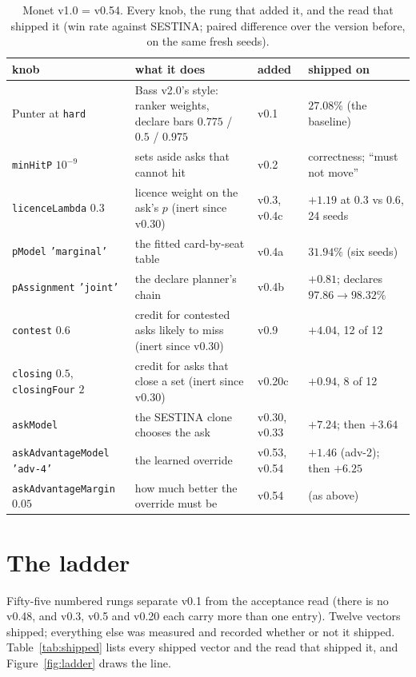 \documentclass[11pt]{article}
\newcommand{\code}[1]{\texttt{#1}}
\begin{document}
\begin{table}[t]
\centering
\small
\caption{Monet v1.0 = v0.54. Every knob, the rung that added it, and the read that shipped it (win rate
against SESTINA; paired difference over the version before, on the same fresh seeds).}
\label{tab:vector}
\begin{tabularx}{\linewidth}{@{}l>{\raggedright\arraybackslash}Xll@{}}
\toprule
knob & what it does & added & shipped on \\
\midrule
Punter at \code{hard} & Bass v2.0's style: ranker weights, declare bars $0.775$ / $0.5$ / $0.975$ & v0.1 & $27.08\%$ (the baseline) \\
\code{minHitP} $10^{-9}$ & sets aside asks that cannot hit & v0.2 & correctness; ``must not move'' \\
\code{licenceLambda} $0.3$ & licence weight on the ask's $p$ (inert since v0.30) & v0.3, v0.4c & $+1.19$ at $0.3$ vs $0.6$, 24 seeds \\
\code{pModel} \code{'marginal'} & the fitted card-by-seat table & v0.4a & $31.94\%$ (six seeds) \\
\code{pAssignment} \code{'joint'} & the declare planner's chain & v0.4b & $+0.81$; declares $97.86 \to 98.32\%$ \\
\code{contest} $0.6$ & credit for contested asks likely to miss (inert since v0.30) & v0.9 & $+4.04$, 12 of 12 \\
\code{closing} $0.5$, \code{closingFour} $2$ & credit for asks that close a set (inert since v0.30) & v0.20c & $+0.94$, 8 of 12 \\
\code{askModel} & the SESTINA clone chooses the ask & v0.30, v0.33 & $+7.24$; then $+3.64$ \\
\code{askAdvantageModel} \code{'adv-4'} & the learned override & v0.53, v0.54 & $+1.46$ (adv-2); then $+6.25$ \\
\code{askAdvantageMargin} $0.05$ & how much better the override must be & v0.54 & (as above) \\
\bottomrule
\end{tabularx}
\end{table}
\section{The ladder}
\label{sec:ladder}

Fifty-five numbered rungs separate v0.1 from the acceptance read (there is no v0.48, and v0.3, v0.5 and
v0.20 each carry more than one entry). Twelve vectors shipped; everything else was measured and
recorded whether or not it shipped. Table~\ref{tab:shipped} lists every shipped vector and the read
that shipped it, and Figure~\ref{fig:ladder} draws the line.
\end{document}
